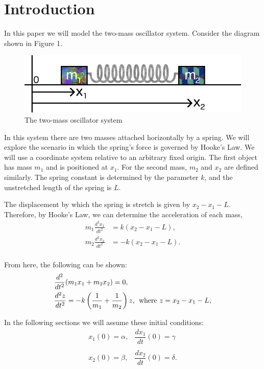 \documentclass[11pt, oneside]{article}   	%
\begin{document}
\section{Introduction}
In this paper we will model the two-mass oscillator system. Consider the diagram shown in Figure 1.

\begin{figure}[h!]
\centering \includegraphics[scale=0.7]{sketch}
\caption{\label{sketch} The two-mass oscillator system}
\end{figure}

In this system there are two masses attached horizontally by a spring. We will explore the scenario in which the spring's force is governed by Hooke's Law. We will use a coordinate system relative to an arbitrary fixed origin. The first object has mass $m_1$ and is positioned at $x_1$. For the second mass, $m_2$ and $x_2$ are defined similarly. The spring constant is determined by the parameter $k$, and the unstretched length of the spring is $L$.

The displacement by which the spring is stretch is given by $x_2 - x_1 -L$. Therefore, by Hooke's Law, we can determine the acceleration of each mass,
\begin{align*}
m_1 \frac{d^2x_1}{dt^2} &= k(x_2 - x_1 - L), \\
m_2 \frac{d^2x_2}{dt^2} &= -k(x_2 - x_1 - L). \\
\end{align*}

From here, the following can be shown:
\begin{align}
&\frac{d^2}{dt^2}(m_1x_1 + m_2x_2) = 0, \\
&\frac{d^2z}{dt^2} = -k\left(\frac{1}{m_1}+\frac{1}{m_2}\right)z \text{, \;where } z = x_2-x_1-L,
\end{align}

In the following sections we will assume these initial conditions:
$$\begin{matrix}
x_1(0) = \alpha, & \dfrac{dx_1}{dt}(0) = \gamma \\ &\\
x_2(0) = \beta, & \dfrac{dx_2}{dt}(0) = \delta.
\end{matrix}$$
\end{document}

